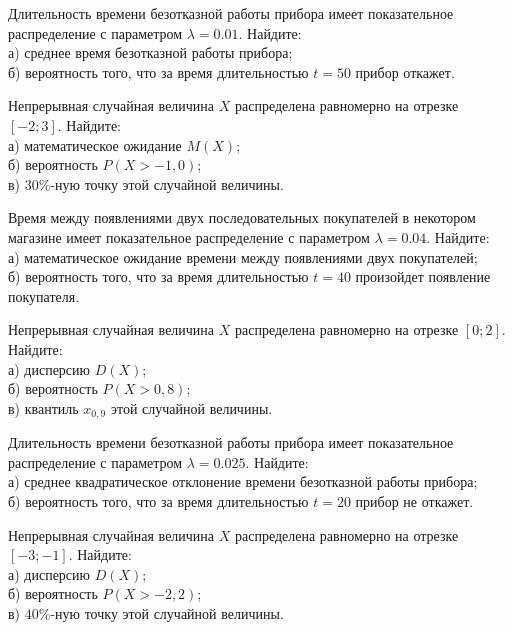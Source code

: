 \vfill

\z Длительность времени безотказной работы прибора имеет показательное распределение с параметром $\lambda = 0.01$. Найдите: \\ \quad а) среднее время безотказной работы прибора; \\ \quad б) вероятность того, что за время длительностью $t = 50$ прибор  откажет.
 

\vfill

\newpage\setcounter{zad}{0}

\z Непрерывная случайная величина $X$ распределена равномерно на отрезке $[-2; 3]$. Найдите: \\ \quad а) математическое ожидание $M(X)$; \\ \quad б) вероятность $P(X>-1{,}0)$; \\ \quad в) $30\%$-ную точку этой случайной величины.


\vfill

\z Время между появлениями двух последовательных покупателей в некотором магазине имеет показательное распределение с параметром $\lambda = 0.04$. Найдите: \\ \quad а) математическое ожидание времени между появлениями двух покупателей; \\ \quad б) вероятность того, что за время длительностью $t = 40$  произойдет появление покупателя.
 

\vfill

\newpage\setcounter{zad}{0}

\z Непрерывная случайная величина $X$ распределена равномерно на отрезке $[0; 2]$. Найдите: \\ \quad а) дисперсию $D(X)$; \\ \quad б) вероятность $P(X>0{,}8)$; \\ \quad в) квантиль $x_{0{,}9}$ этой случайной величины.


\vfill

\z Длительность времени безотказной работы прибора имеет показательное распределение с параметром $\lambda = 0.025$. Найдите: \\ \quad а) среднее квадратическое отклонение времени безотказной работы прибора; \\ \quad б) вероятность того, что за время длительностью $t = 20$ прибор не откажет.
 

\vfill

\newpage\setcounter{zad}{0}

\z Непрерывная случайная величина $X$ распределена равномерно на отрезке $[-3; -1]$. Найдите: \\ \quad а) дисперсию $D(X)$; \\ \quad б) вероятность $P(X>-2{,}2)$; \\ \quad в) $40\%$-ную точку этой случайной величины.


